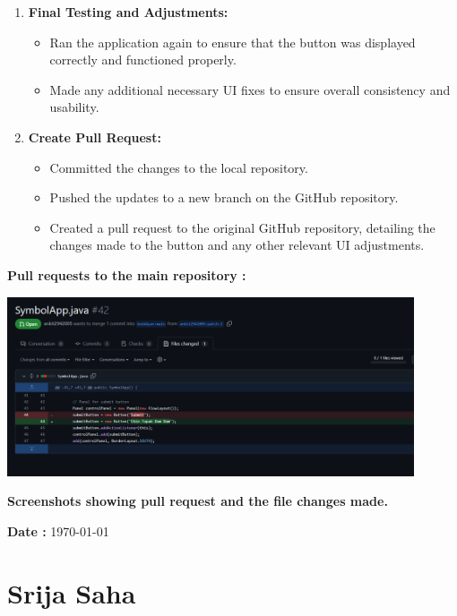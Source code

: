 \documentclass[a4paper,12pt]{article}
\begin{document}
\begin{enumerate}
    \item \textbf{Final Testing and Adjustments:}
    \begin{itemize}
        \item Ran the application again to ensure that the button was displayed correctly and functioned properly.
        \item Made any additional necessary UI fixes to ensure overall consistency and usability.
    \end{itemize}

    \item \textbf{Create Pull Request:}
    \begin{itemize}
        \item Committed the changes to the local repository.
        \item Pushed the updates to a new branch on the GitHub repository.
        \item Created a pull request to the original GitHub repository, detailing the changes made to the button and any other relevant UI adjustments.
    \end{itemize}
\end{enumerate}
\par\vspace{5em}
\large\textbf{Pull requests to the main repository :}
\par\vspace{2em}
\includegraphics[width=0.9\textwidth]{ankit.png}
\par\vspace{2em}
\large\textbf{Screenshots showing pull request and the file changes made.}
\vspace{0.3in}
\newpage

{\textbf{Date :} \today}
\section{Srija Saha}
\end{document}
